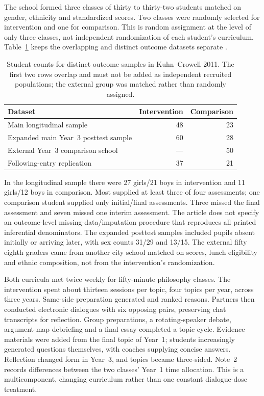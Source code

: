 The school formed three classes of thirty to thirty-two students matched
on gender, ethnicity and standardized scores. Two classes were randomly
selected for intervention and one for comparison. This is random assignment
at the level of only three classes, not independent randomization of
each student's curriculum. Table~\ref{tab:p19-r151-kuhn-crowell-samples}
keeps the overlapping and distinct outcome datasets separate
\cite[pp.~546--547]{KuhnCrowell2011Dialogic}.

\begin{table}[htbp]
\centering\small
\begin{tabularx}{\textwidth}{@{}Xrr@{}}
\hline
Dataset & Intervention & Comparison\\
\hline
Main longitudinal sample & 48 & 23\\
Expanded main Year~3 posttest sample & 60 & 28\\
External Year~3 comparison school & --- & 50\\
Following-entry replication & 37 & 21\\
\hline
\end{tabularx}
\caption{Student counts for distinct outcome samples in Kuhn--Crowell 2011. The first two
rows overlap and must not be added as independent recruited populations;
the external group was matched rather than randomly assigned.}
\label{tab:p19-r151-kuhn-crowell-samples}
\end{table}

In the longitudinal sample there were 27 girls/21 boys in intervention and
11 girls/12 boys in comparison. Most supplied at least three of four
assessments; one comparison student supplied only initial/final assessments.
Three missed the final assessment and seven missed one interim assessment.
The article does not specify an outcome-level missing-data/imputation
procedure that reproduces all printed inferential denominators. The
expanded posttest samples included pupils absent initially or arriving
later, with sex counts 31/29 and 13/15. The external fifty eighth graders
came from another city school matched on scores, lunch eligibility and
ethnic composition, not from the intervention's randomization.

Both curricula met twice weekly for fifty-minute philosophy classes.
The intervention spent about thirteen sessions per topic, four topics
per year, across three years. Same-side preparation generated and ranked
reasons. Partners then conducted electronic dialogues with six opposing
pairs, preserving chat transcripts for reflection. Group preparations,
a rotating-speaker debate, argument-map debriefing and a final essay
completed a topic cycle. Evidence materials were added from the final
topic of Year~1; students increasingly generated questions themselves,
with coaches supplying concise answers. Reflection changed form in
Year~3, and topics became three-sided. Note~2 records differences
between the two classes' Year~1 time allocation. This is a multicomponent,
changing curriculum rather than one constant dialogue-dose treatment.

